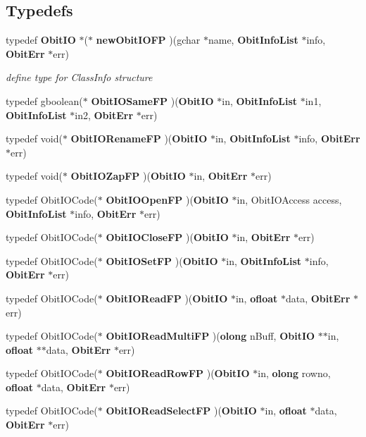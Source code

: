 \subsection*{Typedefs}
\begin{CompactItemize}
\item 
typedef {\bf Obit\-IO} $\ast$($\ast$ {\bf new\-Obit\-IOFP} )(gchar $\ast$name, {\bf Obit\-Info\-List} $\ast$info, {\bf Obit\-Err} $\ast$err)
\begin{CompactList}\small\item\em define type for Class\-Info structure \item\end{CompactList}\item 
typedef gboolean($\ast$ {\bf Obit\-IOSame\-FP} )({\bf Obit\-IO} $\ast$in, {\bf Obit\-Info\-List} $\ast$in1, {\bf Obit\-Info\-List} $\ast$in2, {\bf Obit\-Err} $\ast$err)
\item 
typedef void($\ast$ {\bf Obit\-IORename\-FP} )({\bf Obit\-IO} $\ast$in, {\bf Obit\-Info\-List} $\ast$info, {\bf Obit\-Err} $\ast$err)
\item 
typedef void($\ast$ {\bf Obit\-IOZap\-FP} )({\bf Obit\-IO} $\ast$in, {\bf Obit\-Err} $\ast$err)
\item 
typedef Obit\-IOCode($\ast$ {\bf Obit\-IOOpen\-FP} )({\bf Obit\-IO} $\ast$in, Obit\-IOAccess access, {\bf Obit\-Info\-List} $\ast$info, {\bf Obit\-Err} $\ast$err)
\item 
typedef Obit\-IOCode($\ast$ {\bf Obit\-IOClose\-FP} )({\bf Obit\-IO} $\ast$in, {\bf Obit\-Err} $\ast$err)
\item 
typedef Obit\-IOCode($\ast$ {\bf Obit\-IOSet\-FP} )({\bf Obit\-IO} $\ast$in, {\bf Obit\-Info\-List} $\ast$info, {\bf Obit\-Err} $\ast$err)
\item 
typedef Obit\-IOCode($\ast$ {\bf Obit\-IORead\-FP} )({\bf Obit\-IO} $\ast$in, {\bf ofloat} $\ast$data, {\bf Obit\-Err} $\ast$err)
\item 
typedef Obit\-IOCode($\ast$ {\bf Obit\-IORead\-Multi\-FP} )({\bf olong} n\-Buff, {\bf Obit\-IO} $\ast$$\ast$in, {\bf ofloat} $\ast$$\ast$data, {\bf Obit\-Err} $\ast$err)
\item 
typedef Obit\-IOCode($\ast$ {\bf Obit\-IORead\-Row\-FP} )({\bf Obit\-IO} $\ast$in, {\bf olong} rowno, {\bf ofloat} $\ast$data, {\bf Obit\-Err} $\ast$err)
\item 
typedef Obit\-IOCode($\ast$ {\bf Obit\-IORead\-Select\-FP} )({\bf Obit\-IO} $\ast$in, {\bf ofloat} $\ast$data, {\bf Obit\-Err} $\ast$err)
\item 

\end{CompactItemize}
